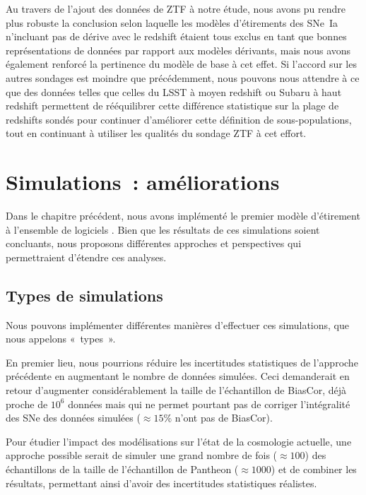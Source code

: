\documentclass[../main/main.tex]{subfiles}
\begin{document}
Au travers de l'ajout des données de ZTF à notre étude, nous avons pu rendre
plus robuste la conclusion selon laquelle les modèles d'étirements des SNe~Ia
n'incluant pas de dérive avec le redshift étaient tous exclus en tant que bonnes
représentations de données par rapport aux modèles dérivants, mais nous avons
également renforcé la pertinence du modèle de base à cet effet. Si l'accord sur
les autres sondages est moindre que précédemment, nous pouvons nous attendre à
ce que des données telles que celles du LSST à moyen redshift ou Subaru à haut
redshift permettent de rééquilibrer cette différence statistique sur la plage de
redshifts sondés pour continuer d'améliorer cette définition de
sous-populations, tout en continuant à utiliser les qualités du sondage ZTF à
cet effort.

\section{Simulations~: améliorations}\label{sec:simpersp}

Dans le chapitre précédent, nous avons implémenté le premier modèle d'étirement
à l'ensemble de logiciels \snana. Bien que les résultats de ces simulations
soient concluants, nous proposons différentes approches et perspectives qui
permettraient d'étendre ces analyses.

\subsection{Types de simulations}\label{ssec:types}

Nous pouvons implémenter différentes manières d'effectuer ces simulations, que
nous appelons «~types~».

En premier lieu, nous pourrions réduire les incertitudes statistiques de
l'approche précédente en augmentant le nombre de données simulées. Ceci
demanderait en retour d'augmenter considérablement la taille de l'échantillon de
BiasCor, déjà proche de $10^6$ données mais qui ne permet pourtant pas de
corriger l'intégralité des SNe des données simulées ($\approx 15\%$ n'ont pas de
BiasCor).

Pour étudier l'impact des modélisations sur l'état de la cosmologie actuelle,
une approche possible serait de simuler une grand nombre de fois ($\approx
\num{100}$) des échantillons de la taille de l'échantillon de Pantheon ($\approx
\num{1000}$) et de combiner les résultats, permettant ainsi d'avoir des
incertitudes statistiques réalistes.
\end{document}

